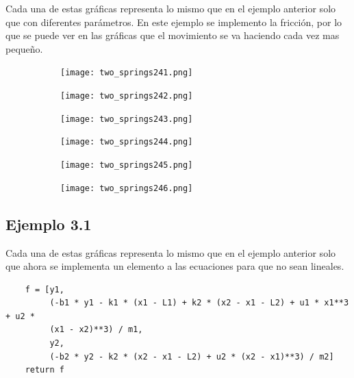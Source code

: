 \documentclass{article}
\begin{document}
Cada una de estas gráficas representa lo mismo que en el ejemplo anterior solo que con diferentes parámetros. En este ejemplo se implemento la fricción, por lo que se puede ver en las gráficas que el movimiento se va haciendo cada vez mas pequeño.

\begin{figure}[h!]
  \centering
  \begin{subfigure}[b]{0.32\linewidth}
    \texttt{[image: two\_springs241.png]}
     \caption{}
  \end{subfigure}
  \begin{subfigure}[b]{0.32\linewidth}
    \texttt{[image: two\_springs242.png]}
    \caption{}
  \end{subfigure}
  \begin{subfigure}[b]{0.32\linewidth}
    \texttt{[image: two\_springs243.png]}
    \caption{}
  \end{subfigure}
  \begin{subfigure}[b]{0.45\linewidth}
    \texttt{[image: two\_springs244.png]}
    \caption{}
  \end{subfigure}
  \begin{subfigure}[b]{0.45\linewidth}
    \texttt{[image: two\_springs245.png]}
    \caption{}
  \end{subfigure}
  \begin{subfigure}[b]{0.5\linewidth}
    \texttt{[image: two\_springs246.png]}
    \caption{}
  \end{subfigure}
\end{figure}

\vspace{1.5cm}

\subsection*{Ejemplo 3.1}

Cada una de estas gráficas representa lo mismo que en el ejemplo anterior solo que ahora se implementa un elemento a las ecuaciones para que no sean lineales.

\begin{verbatim}
    f = [y1,
         (-b1 * y1 - k1 * (x1 - L1) + k2 * (x2 - x1 - L2) + u1 * x1**3 + u2 * 
         (x1 - x2)**3) / m1,
         y2,
         (-b2 * y2 - k2 * (x2 - x1 - L2) + u2 * (x2 - x1)**3) / m2]
    return f
\end{verbatim}
\end{document}
